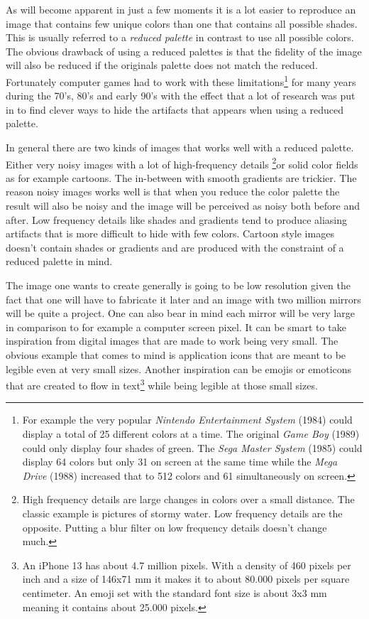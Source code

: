 \documentclass{article}
\begin{document}
As will become apparent in just a few moments it is a lot easier to
reproduce an image that contains few unique colors than one that
contains all possible shades. This is usually referred to a
\emph{reduced palette} in contrast to use all possible colors. The
obvious drawback of using a reduced palettes is that the fidelity of the
image will also be reduced if the originals palette does not match the
reduced. Fortunately computer games had to work with these
limitations\footnote{For example the very popular \emph{Nintendo
  Entertainment System} (1984) could display a total of 25 different
  colors at a time. The original \emph{Game Boy} (1989) could only
  display four shades of green. The \emph{Sega Master System} (1985)
  could display 64 colors but only 31 on screen at the same time while
  the \emph{Mega Drive} (1988) increased that to 512 colors and 61
  simultaneously on screen.} for many years during the 70's, 80's and
early 90's with the effect that a lot of research was put in to find clever ways to
hide the artifacts that appears when using a reduced palette.

In general there are two kinds of images that works well with a reduced
palette. Either very noisy images with a lot of high-frequency details
\footnote{High frequency details are large changes in colors over a
  small distance. The classic example is pictures of stormy water. Low
  frequency details are the opposite. Putting a blur filter on low
  frequency details doesn't change much.}or solid color fields as for
example cartoons. The in-between with smooth gradients are trickier. The
reason noisy images works well is that when you reduce the color
palette the result will also be noisy and the image will be perceived as
noisy both before and after. Low frequency details like shades and
gradients tend to produce aliasing artifacts that is more difficult to
hide with few colors. Cartoon style images doesn't contain shades or
gradients and are produced with the constraint of a reduced palette in
mind.

The image one wants to create generally is going to be low resolution
given the fact that one will have to fabricate it later and an image
with two million mirrors will be quite a project. One can also bear in
mind each mirror will be very large in comparison to for example a
computer screen pixel. It can be smart to take inspiration from digital
images that are made to work being very small. The obvious example that
comes to mind is application icons that are meant to be legible even at
very small sizes. Another inspiration can be emojis or emoticons that
are created to flow in text\footnote{An iPhone 13 has about 4.7 million
  pixels. With a density of 460 pixels per inch and a size of 146x71 mm
  it makes it to about 80.000 pixels per square centimeter. An emoji set
  with the standard font size is about 3x3 mm meaning it contains about
  25.000 pixels.} while being legible at those small sizes.
\end{document}
